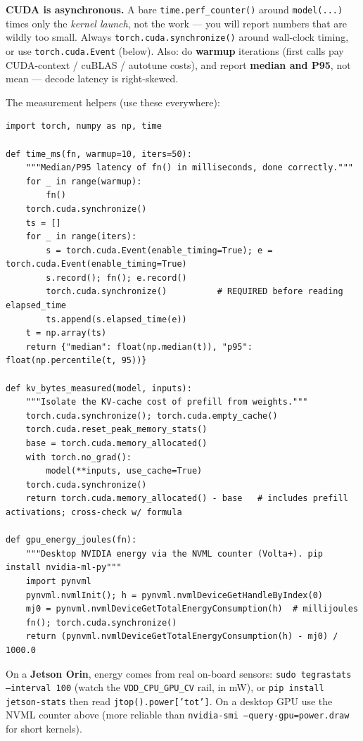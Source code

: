 \documentclass[11pt]{article}
\newcommand{\code}[1]{\texttt{\small #1}}
\begin{document}
\begin{pitfall}
\textbf{CUDA is asynchronous.} A bare \code{time.perf\_counter()} around \code{model(...)} times
only the \emph{kernel launch}, not the work --- you will report numbers that are wildly too
small. Always \code{torch.cuda.synchronize()} around wall-clock timing, or use
\code{torch.cuda.Event} (below). Also: do \textbf{warmup} iterations (first calls pay
CUDA-context / cuBLAS / autotune costs), and report \textbf{median and P95}, not mean --- decode
latency is right-skewed.
\end{pitfall}

The measurement helpers (use these everywhere):

\begin{lstlisting}
import torch, numpy as np, time

def time_ms(fn, warmup=10, iters=50):
    """Median/P95 latency of fn() in milliseconds, done correctly."""
    for _ in range(warmup):
        fn()
    torch.cuda.synchronize()
    ts = []
    for _ in range(iters):
        s = torch.cuda.Event(enable_timing=True); e = torch.cuda.Event(enable_timing=True)
        s.record(); fn(); e.record()
        torch.cuda.synchronize()          # REQUIRED before reading elapsed_time
        ts.append(s.elapsed_time(e))
    t = np.array(ts)
    return {"median": float(np.median(t)), "p95": float(np.percentile(t, 95))}

def kv_bytes_measured(model, inputs):
    """Isolate the KV-cache cost of prefill from weights."""
    torch.cuda.synchronize(); torch.cuda.empty_cache()
    torch.cuda.reset_peak_memory_stats()
    base = torch.cuda.memory_allocated()
    with torch.no_grad():
        model(**inputs, use_cache=True)
    torch.cuda.synchronize()
    return torch.cuda.memory_allocated() - base   # includes prefill activations; cross-check w/ formula

def gpu_energy_joules(fn):
    """Desktop NVIDIA energy via the NVML counter (Volta+). pip install nvidia-ml-py"""
    import pynvml
    pynvml.nvmlInit(); h = pynvml.nvmlDeviceGetHandleByIndex(0)
    mj0 = pynvml.nvmlDeviceGetTotalEnergyConsumption(h)  # millijoules
    fn(); torch.cuda.synchronize()
    return (pynvml.nvmlDeviceGetTotalEnergyConsumption(h) - mj0) / 1000.0
\end{lstlisting}

\begin{tipbox}
On a \textbf{Jetson Orin}, energy comes from real on-board sensors: \code{sudo tegrastats --interval 100}
(watch the \code{VDD\_CPU\_GPU\_CV} rail, in mW), or \code{pip install jetson-stats} then read
\code{jtop().power['tot']}. On a desktop GPU use the NVML counter above (more reliable than
\code{nvidia-smi --query-gpu=power.draw} for short kernels).
\end{tipbox}
\end{document}
